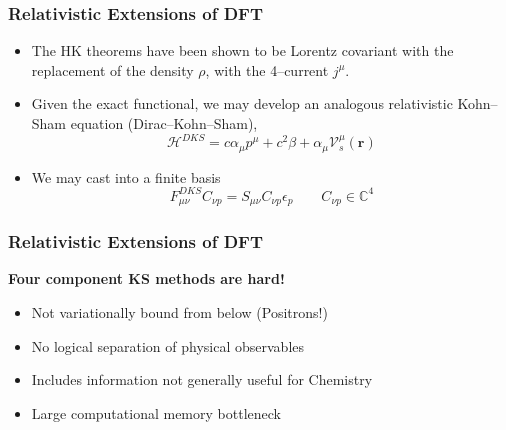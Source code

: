 \documentclass{beamer}
\begin{document}
\begin{frame}
\frametitle{Relativistic Extensions of DFT}

\begin{itemize}
  \item The HK theorems have been shown to be Lorentz covariant with the replacement
  of the density $\rho$, with the 4--current $j^\mu$.

  \item Given the exact functional, we may develop an analogous relativistic Kohn--Sham
  equation (Dirac--Kohn--Sham),
  \begin{equation*}
    \mathcal{H}^{DKS} = c\alpha_\mu p^\mu + c^2\beta + \alpha_\mu \mathcal{V}_s^\mu(\mathbf{r})
  \end{equation*}

  \item We may cast into a finite basis
  \begin{equation*}
    F_{\mu\nu}^{DKS} C_{\nu p} = S_{\mu\nu}C_{\nu p} \epsilon_p \qquad C_{\nu p} \in \mathbb{C}^4
  \end{equation*}
\end{itemize}
\end{frame}

\begin{frame}
\frametitle{Relativistic Extensions of DFT}

\begin{center} \bf \LARGE Four component KS methods are hard! \end{center}
\begin{itemize}
  \item Not variationally bound from below (Positrons!)
  \item No logical separation of physical observables
  \item Includes information not generally useful for Chemistry
  \item Large computational memory bottleneck
\end{itemize}

\end{frame}
\end{document}
